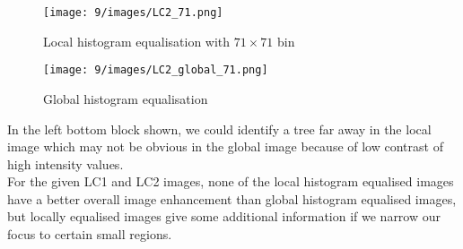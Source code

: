 \documentclass[12pt]{article}
\begin{document}
\begin{itemize}
    \begin{figure}[H]
        \centering
        \begin{minipage}{.45\textwidth}
          \centering
          \texttt{[image: 9/images/LC2\_71.png]}
          \caption*{Local histogram equalisation with $71\times 71$ bin}
          \label{fig:totalpowervst}
        \end{minipage}
        \begin{minipage}{.45\textwidth}
          \centering
          \texttt{[image: 9/images/LC2\_global\_71.png]}
          \caption*{Global histogram equalisation}
          \label{fig:totalpower2}
        \end{minipage}
        \label{fig:totalPower}
    \end{figure}
    In the left bottom block shown, we could identify a tree far away in the local image which may not be obvious in the global image because of low contrast of high intensity values.\\[20pt]
    For the given LC1 and LC2 images, none of the local histogram equalised images have a better overall image enhancement than global histogram equalised images, but locally equalised images give some additional information if we narrow our focus to certain small regions. 
\end{itemize}
\end{document}
